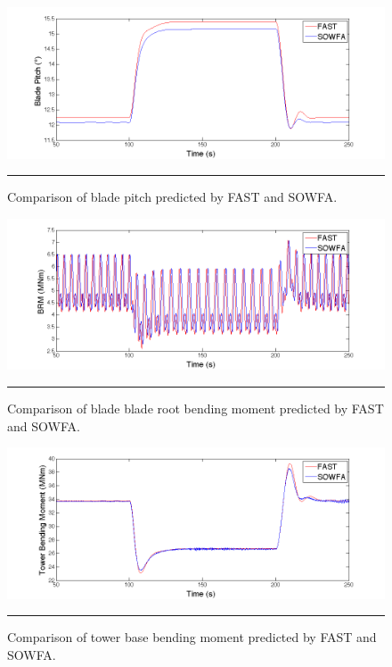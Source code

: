 \begin{figure}[htbp]	\label{fig6-4}
	\centering
		\includegraphics[trim = {1cm 0 2cm 0}, clip, width = \linewidth]{Figures/ch6Figures/fig6-4.png}
		\rule{35em}{0.5pt}
	\caption{Comparison of blade pitch predicted by FAST and SOWFA.}
\end{figure}

\begin{figure}[htbp]	\label{fig6-5}
	\centering
		\includegraphics[trim = {1cm 0 2cm 0}, clip, width = \linewidth]{Figures/ch6Figures/fig6-5.png}
		\rule{35em}{0.5pt}
	\caption{Comparison of blade blade root bending moment predicted by FAST and SOWFA.}
\end{figure}

\begin{figure}[htbp]	\label{fig6-6}
	\centering
		\includegraphics[trim = {1cm 0 2cm 0}, clip, width = \linewidth]{Figures/ch6Figures/fig6-6.png}
		\rule{35em}{0.5pt}
	\caption{Comparison of tower base bending moment predicted by FAST and SOWFA.}
\end{figure}




